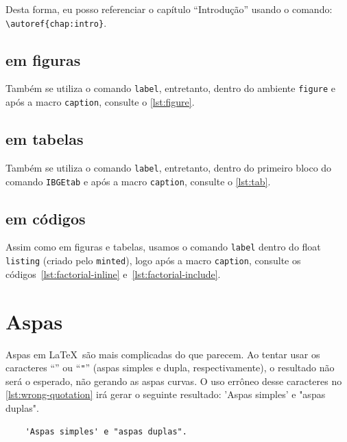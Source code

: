 Desta forma, eu posso referenciar o capítulo \enquote{Introdução} usando o comando: \texttt{\textbackslash{}autoref\{chap:intro\}}.

\subsection{\texorpdfstring{}{Labels} em figuras}

Também se utiliza o comando \texttt{label}, entretanto, dentro do ambiente \texttt{figure} e após a macro \texttt{caption}, consulte o \autoref{lst:figure}.

\subsection{\texorpdfstring{}{Labels} em tabelas}

Também se utiliza o comando \texttt{label}, entretanto, dentro do primeiro bloco do comando \texttt{IBGEtab} e após a macro \texttt{caption}, consulte o \autoref{lst:tab}.

\subsection{\texorpdfstring{}{Labels} em códigos}

Assim como em figuras e tabelas, usamos o comando \texttt{label} dentro do float \texttt{listing} (criado pelo \texttt{minted}), logo após a macro \texttt{caption}, consulte os códigos~\ref{lst:factorial-inline} e~\ref{lst:factorial-include}.

\section{Aspas}

Aspas em \LaTeX\ são mais complicadas do que parecem. Ao tentar usar os caracteres \enquote{\texttt{\textquotesingle}} ou \enquote{\texttt{"}} (aspas simples e dupla, respectivamente), o resultado não será o esperado, não gerando as aspas curvas. %
O uso errôneo desse caracteres no \autoref{lst:wrong-quotation} irá gerar o seguinte resultado:
'Aspas simples' e "aspas duplas". %

\begin{listing}[htb]
  \begin{verbatim}
    'Aspas simples' e "aspas duplas".
  \end{verbatim}
  \caption{Uso incorreto de aspas}
  \label{lst:wrong-quotation}
\end{listing}

